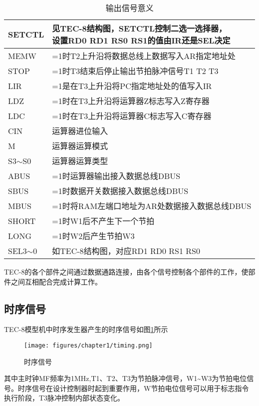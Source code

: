 \begin{table}[htbp]
{\begin{tabular}{|l|l|}
            SETCTL      & \makecell[l] {见TEC-8结构图，SETCTL控制二选一选择器， \\设置RD0 RD1 RS0 RS1的值由IR还是SEL决定} \\ \hline
            MEMW        & =1时T2上升沿将数据总线上数据写入AR指定地址处               \\ \hline
            STOP        & =1时T3结束后停止输出节拍脉冲信号T1 T2 T3              \\ \hline
            LIR         & =1是在T3上升沿将PC指定地址处的值写入IR                 \\ \hline
            LDZ         & =1时在T3上升沿将运算器Z标志写入Z寄存器                  \\ \hline
            LDC         & =1时在T3上升沿将运算器C标志写入C寄存器                  \\ \hline
            CIN         & 运算器进位输入                                 \\ \hline
            M           & 运算器运算模式                                 \\ \hline
            S3$\sim$S0  & 运算器运算类型                                 \\ \hline
            ABUS        & =1时运算器输出接入数据总线DBUS                      \\ \hline
            SBUS        & =1时数据开关数据接入数据总线DBUS                     \\ \hline
            MBUS        & =1时将RAM左端口地址为AR处数据接入数据总线DBUS            \\ \hline
            SHORT       & =1时W1后不产生下一个节拍                          \\ \hline
            LONG        & =1时W2后产生节拍W3                            \\ \hline
            SEL3$\sim$0 & 如TEC-8结构图，对应RD1 RD0 RS1 RS0             \\ \hline
        \end{tabular}}
    \caption{输出信号意义}

\end{table}

TEC-8的各个部件之间通过数据通路连接，由各个信号控制各个部件的工作，使部件之间互相配合完成计算工作。

\clearpage
\subsection{时序信号}

TEC-8模型机中时序发生器产生的时序信号如图\ref{fig:timing}所示

\begin{figure}[htbp]
    \centering
    \texttt{[image: figures/chapter1/timing.png]}
    \caption{时序信号}
    \label{fig:timing}
\end{figure}

其中主时钟MF频率为1MHz,T1、T2、T3为节拍脉冲信号，W1\~{}W3为节拍电位信号。时序信号在设计控制器时起到重要作用，W节拍电位信号可以用于标志指令执行阶段，T3脉冲控制内部状态变化。

